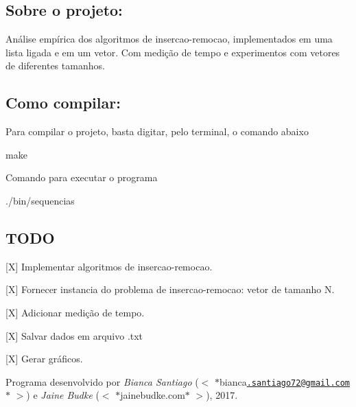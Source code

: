\subsection*{Sobre o projeto\+:}

Análise empírica dos algoritmos de insercao-\/remocao, implementados em uma lista ligada e em um vetor. Com medição de tempo e experimentos com vetores de diferentes tamanhos.

\subsection*{Como compilar\+:}

Para compilar o projeto, basta digitar, pelo terminal, o comando abaixo

\begin{DoxyVerb}make
\end{DoxyVerb}


Comando para executar o programa \begin{DoxyVerb}./bin/sequencias
\end{DoxyVerb}


\subsection*{T\+O\+DO}


\begin{DoxyItemize}
\item \mbox{[}X\mbox{]} Implementar algoritmos de insercao-\/remocao.
\item \mbox{[}X\mbox{]} Fornecer instancia do problema de insercao-\/remocao\+: vetor de tamanho N.
\item \mbox{[}X\mbox{]} Adicionar medição de tempo.
\item \mbox{[}X\mbox{]} Salvar dados em arquivo .txt
\item \mbox{[}X\mbox{]} Gerar gráficos.
\end{DoxyItemize}

Programa desenvolvido por {\itshape Bianca Santiago} ($<$ $\ast$bianca\href{mailto:.santiago72@gmail.com}{\tt .\+santiago72@gmail.\+com}$\ast$ $>$) e {\itshape Jaine Budke} ($<$ $\ast$jainebudke.com$\ast$ $>$), 2017. 